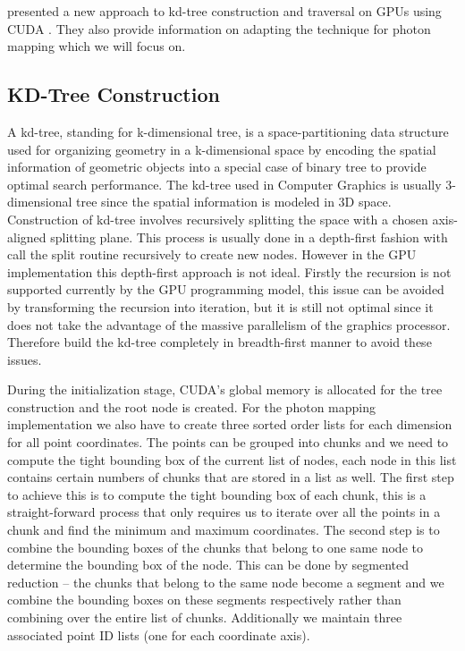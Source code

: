 \citeauthor{Zhou2008} presented a new approach to kd-tree construction and traversal on GPUs using CUDA \cite{Zhou2008}. They also provide information on adapting the technique for photon mapping which we will focus on.

\subsection{KD-Tree Construction}
\label{subsec:kdtree_construction}

A kd-tree, standing for k-dimensional tree, is a space-partitioning data structure used for organizing geometry in a k-dimensional space by encoding the spatial information of geometric objects into a special case of binary tree to provide optimal search performance. The kd-tree used in Computer Graphics is usually 3-dimensional tree since the spatial information is modeled in 3D space. Construction of kd-tree involves recursively splitting the space with a chosen axis-aligned splitting plane. This process is usually done in a depth-first fashion with call the split routine recursively to create new nodes. However in the GPU implementation this depth-first approach is not ideal. Firstly the recursion is not supported currently by the GPU programming model, this issue can be avoided by transforming the recursion into iteration, but it is still not optimal since it does not take the advantage of the massive parallelism of the graphics processor. Therefore \citeauthor{Zhou2008} build the kd-tree completely  in breadth-first manner to avoid these issues.

During the initialization stage, CUDA's global memory is allocated for the tree construction and the root node is created. For the photon mapping implementation we also have to create three sorted order lists for each dimension for all point coordinates. The points can be grouped into chunks and we need to compute the tight bounding box of the current list of nodes, each node in this list contains certain numbers of chunks that are stored in a list as well. The first step to achieve this is to compute the tight bounding box of each chunk, this is a straight-forward process that only requires us to iterate over all the points in a chunk and find the minimum and maximum coordinates. The second step is to combine the bounding boxes of the chunks that belong to one same node to determine the bounding box of the node. This can be done by segmented reduction -- the chunks that belong to the same node become a segment and we combine the bounding boxes on these segments respectively rather than combining over the entire list of chunks.
Additionally we maintain three associated point ID lists (one for each coordinate axis).

